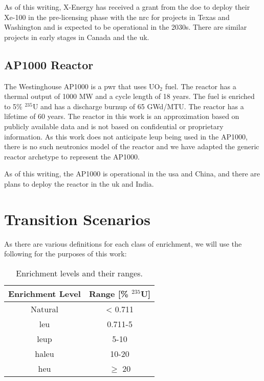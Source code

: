 As of this writing, X-Energy has received a grant from the \gls{doe} to deploy their Xe-100 in the pre-licensing phase with the \gls{nrc} for projects in Texas and Washington and is expected to be operational in the 2030s. There are similar projects in early stages in Canada and the \gls{uk}.


\subsection{AP1000 Reactor}
\label{sec:ap}

The Westinghouse AP1000 is a \gls{pwr} that uses UO$_2$ fuel. The reactor has a thermal output of 1000 MW and a cycle length of 18 years. The fuel is enriched to 5\% $^{235}$U and has a discharge burnup of 65 GWd/MTU. The reactor has a lifetime of 60 years. The reactor in this work is an approximation based on publicly available data and is not based on confidential or proprietary information. As this work does not anticipate \gls{leup} being used in the AP1000, there is no such neutronics model of the reactor and we have adapted the generic \cycamore reactor archetype to represent the AP1000.

As of this writing, the AP1000 is operational in the \gls{usa} and China, and there are plans to deploy the reactor in the \gls{uk} and India.

\section{Transition Scenarios}
\label{sec:transition_scenarios}

As there are various definitions for each class of enrichment, we will use the following for the purposes of this work:

\begin{table}[htbp]
   \centering
   \caption{Enrichment levels and their ranges.}
   \label{tab:enrichment_levels}
   \begin{tabular}{c c}
      \hline
      \textbf{Enrichment Level} & \textbf{Range [\%  $^{235}$U]} \\
      \hline
      Natural & < 0.711 \\
      \gls{leu} & 0.711-5 \\
      \gls{leup} & 5-10 \\
      \gls{haleu} & 10-20 \\
      \gls{heu} & $\geq$ 20  \\
      \hline
   \end{tabular}
\end{table}



